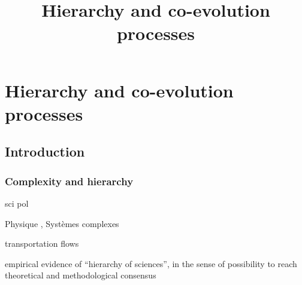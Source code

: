 \documentclass[english,fleqn,allpages]{ISTE_science}[2018/07/30]
\title{Hierarchy and co-evolution processes}
\begin{document}
\raggedbottom



\mainmatter
\chapter{Hierarchy and co-evolution processes}%
\label{chap-struct}






\cite{pumain:halshs-02303136}

\section{Introduction}



\subsection{Complexity and hierarchy}

sci pol \cite{crumley1987dialectical}

Physique \cite{10.1371/journal.pone.0033799}, Systèmes complexes \cite{pumain2006hierarchy}


\cite{jiang2009street} transportation flows

\cite{fanelli2013bibliometric} empirical evidence of ``hierarchy of sciences'', in the sense of possibility to reach theoretical and methodological consensus %
\end{document}

